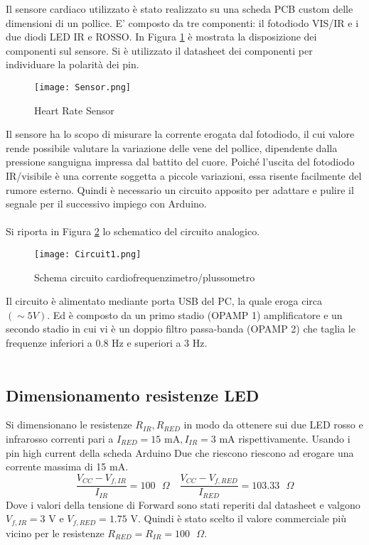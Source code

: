 Il sensore cardiaco utilizzato è stato realizzato su una scheda PCB custom delle dimensioni di un pollice. E' composto da tre componenti: il fotodiodo VIS/IR e i due diodi LED IR e ROSSO. In Figura \ref{fig:HRS} è mostrata la disposizione dei componenti sul sensore. Si è utilizzato il datasheet dei componenti per individuare la polarità dei pin.
\begin{figure}[H]
    \centering
    \texttt{[image: Sensor.png]}
    \caption{Heart Rate Sensor}
    \label{fig:HRS}
\end{figure}
Il sensore ha lo scopo di misurare la corrente erogata dal fotodiodo, il cui valore rende possibile valutare la variazione delle vene del pollice, dipendente dalla pressione sanguigna impressa dal battito del cuore.
Poiché l'uscita del fotodiodo IR/visibile è una corrente soggetta a piccole variazioni, essa risente facilmente del rumore esterno. Quindi è necessario un circuito apposito per adattare e pulire il segnale per il successivo impiego con Arduino.\\\\
Si riporta in Figura \ref{fig:Circuit} lo schematico del circuito analogico.
\begin{figure}[H]
    \centering
    \texttt{[image: Circuit1.png]}
    \caption{Schema circuito cardiofrequenzimetro/plussometro}
    \label{fig:Circuit}
\end{figure}
Il circuito è alimentato mediante porta USB del PC, la quale eroga circa $(\sim 5 V)$. Ed è composto da un primo stadio (OPAMP 1) amplificatore e un secondo stadio in cui vi è un doppio filtro passa-banda (OPAMP 2) che taglia le frequenze inferiori a 0.8 Hz e superiori a 3 Hz.\\\\
\subsection{Dimensionamento resistenze LED}
Si dimensionano le resistenze $R_{IR},R_{RED}$ in modo da ottenere sui due LED rosso e infrarosso correnti pari a $I_{RED}=15\text{ mA},I_{IR}=$3 mA rispettivamente. Usando i pin high current della scheda Arduino Due che riescono riescono ad erogare una corrente massima di 15 mA.
\begin{equation}
    \frac{V_{CC}-V_{f,IR}}{I_{IR}}=100\text{ }\Omega\quad\frac{V_{CC}-V_{f,RED}}{I_{RED}}=103.33\text{ }\Omega
\end{equation}
Dove i valori della tensione di Forward sono stati reperiti dal datasheet e valgono $V_{f,IR}=3$ V e $V_{f,RED}=1.75$ V. Quindi è stato scelto il valore commerciale più vicino per le resistenze $R_{RED} = R_{IR} = 100\text{ }\Omega$.
